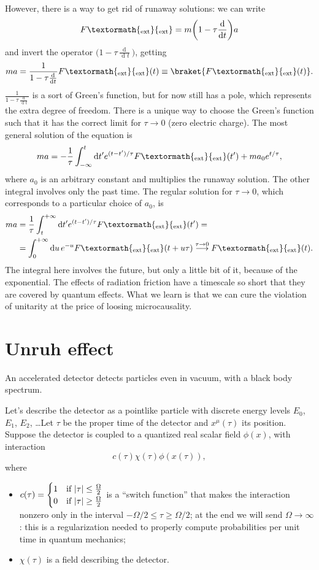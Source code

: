 \documentclass[a4paper,12pt]{book}
\newcommand{\ped}[1]{\textormath{\textsubscript{#1}}{_{\mathrm{#1}}}}
\DeclarePairedDelimiter{\abs}{\lvert}{\rvert}
\newcommand{\dd}{\mathop{\mathrm{d}\!}{}}
\theoremstyle{definition}
\theoremstyle{remark}
\begin{document}
However, there is a way to get rid of runaway solutions: we can write
\[F\ped{ext}=m\biggl(1-\tau\frac{\dd}{\dd t}\biggr)a\]
and invert the operator $\bigl(1-\tau\frac{\dd}{\dd t}\bigr)$, getting
\[ma=\frac1{1-\tau\frac{\dd}{\dd t}}F\ped{ext}(t)\equiv \braket{F\ped{ext}(t)}.\]
$\frac1{1-\tau\frac{\dd}{\dd t}}$ is a sort of Green's function, but for now still has a pole, which represents the extra degree of freedom. There is a unique way to choose the Green's function such that it has the correct limit for $\tau\to0$ (zero electric charge). The most general solution of the equation is
\[ma=-\frac1\tau\int_{-\infty}^t\dd t'e^{(t-t')/\tau}F\ped{ext}(t')+ma_0e^{t/\tau},\]
where $a_0$ is an arbitrary constant and multiplies the runaway solution. The other integral involves only the past time. The regular solution for $\tau\to0$, which corresponds to a particular choice of $a_0$, is
\begin{align*}
ma&=\frac1\tau\int_t^{+\infty}\dd t'e^{(t-t')/\tau}F\ped{ext}(t')=\\
&=\int_0^{+\infty}\dd u\,e^{-u}F\ped{ext}(t+u\tau)\overset{\tau\to0}{\longrightarrow}F\ped{ext}(t)
.
\end{align*}
The integral here involves the future, but only a little bit of it, because of the exponential. The effects of radiation friction have a timescale so short that they are covered by quantum effects. What we learn is that we can cure the violation of unitarity at the price of loosing microcausality.

\section{Unruh effect}
An accelerated detector detects particles even in vacuum, with a black body spectrum.

Let's describe the detector as a pointlike particle with discrete energy levels $E_0$, $E_1$, $E_2$, \ldots Let $\tau$ be the proper time of the detector and $x^\mu(\tau)$ its position. Suppose the detector is coupled to a quantized real scalar field $\phi(x)$, with interaction
\[c(\tau)\chi(\tau)\phi(x(\tau)),\]
where
\begin{itemize}
\item $c(\tau)=\begin{cases}1&\text{if }\abs{\tau}\le\frac\Omega2\\ 0&\text{if }\abs{\tau}\ge\frac\Omega2\end{cases}$ is a ``switch function'' that makes the interaction nonzero only in the interval $-\Omega/2\le\tau\ge\Omega/2$; at the end we will send $\Omega\to\infty$: this is a regularization needed to properly compute probabilities per unit time in quantum mechanics;
\item $\chi(\tau)$ is a field describing the detector.
\end{itemize}
\end{document}
